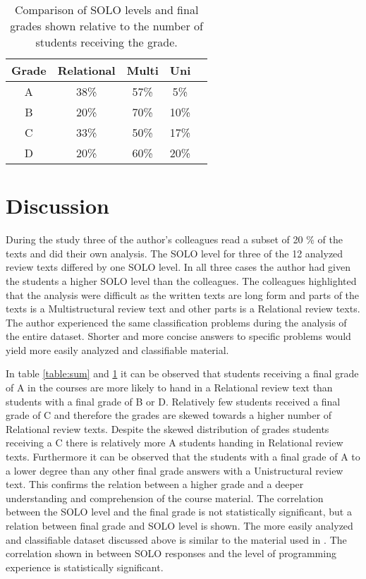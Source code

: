 \documentclass[twoside,twocolumn,a4paper,11pt,english]{article}
\begin{document}
\begin{table}[H]
\caption{Comparison of SOLO levels and final grades shown relative to the number of students receiving the grade.}
\centering
\begin{tabular}{c | c c c c}
Grade & Relational & Multi & Uni \\ [0.5ex] %
\hline
A & 38\% & 57\% & 5\% \\
B & 20\% & 70\% & 10\% \\
C & 33\% & 50\% & 17\% \\
D & 20\% & 60\% & 20\% \\ [1ex]
\end{tabular}
\label{table:percentage}
\end{table}




\section{Discussion}

During the study three of the author's colleagues read a subset of 20 \% of the texts and did their own analysis. The SOLO level for three of the 12 analyzed review texts differed by one SOLO level. In all three cases the author had given the students a higher SOLO level than the colleagues. The colleagues highlighted that the analysis were difficult as the written texts are long form and parts of the texts is a Multistructural review text and other parts is a Relational review texts. The author experienced the same classification problems during the analysis of the entire dataset. Shorter and more concise answers to specific problems would yield more easily analyzed and classifiable material.

In table \ref{table:sum} and \ref{table:percentage} it can be observed that students receiving a final grade of A in the courses are more likely to hand in a Relational review text than students with a final grade of B or D. Relatively few students received a final grade of C and therefore the grades are skewed towards a higher number of Relational review texts. Despite the skewed distribution of grades students receiving a C there is relatively more A students handing in Relational review texts. Furthermore it can be observed that the students with a final grade of A to a lower degree than any other final grade answers with a Unistructural review text. This confirms the relation between a higher grade and a deeper understanding and comprehension of the course material. The correlation between the SOLO level and the final grade is not statistically significant, but a relation between final grade and SOLO level is shown. The more easily analyzed and classifiable dataset discussed above is similar to the material used in \cite{lister2006not}. The correlation shown in \cite{lister2006not} between SOLO responses and the level of programming experience is statistically significant.
\end{document}
